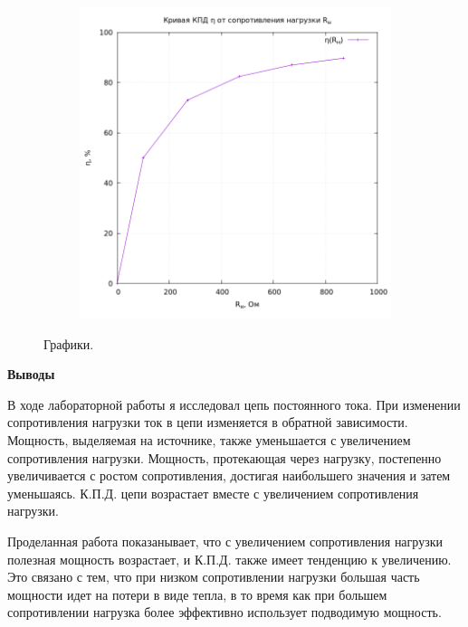 \documentclass[12pt, a4paper]{report}
\begin{document}
\begin{enumerate}
\begin{figure}[H]
\begin{subfigure}{0.5\linewidth}
				\end{subfigure}
				\begin{subfigure}{0.5\linewidth}
					\includegraphics[width=\linewidth]{n_R.png}
				\end{subfigure}

				\caption{Графики.}
				\label{plots}
			\end{figure}
	\end{enumerate}

	\begin{center}
		\textbf{Выводы}
	\end{center}
	\par В ходе лабораторной работы я исследовал цепь постоянного тока. При изменении сопротивления нагрузки ток в цепи изменяется в обратной зависимости. Мощность, выделяемая на источнике, также уменьшается с увеличением сопротивления нагрузки. Мощность, протекающая через нагрузку, постепенно увеличивается с ростом сопротивления, достигая наибольшего значения и затем уменьшаясь. К.П.Д. цепи возрастает вместе с увеличением сопротивления нагрузки.
	\par Проделанная работа показанывает, что с увеличением сопротивления нагрузки полезная мощность возрастает, и К.П.Д. также имеет тенденцию к увеличению. Это связано с тем, что при низком сопротивлении нагрузки большая часть мощности идет на потери в виде тепла, в то время как при большем сопротивлении нагрузка более эффективно использует подводимую мощность.
\end{document}
